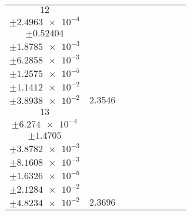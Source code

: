 \documentclass[8pt]{article}
\begin{document}
\begin{longtable}[l]{c c c c c c c c c}
$\num{12}$ & \begin{tabular}[c]{@{}c@{}}$\num{2.8388e-2}$ \\ $\pm\num{2.4963e-4}$\end{tabular} & \begin{tabular}[c]{@{}c@{}}$\num{-1.2234}$ \\ $\pm\num{0.52404}$\end{tabular} & \begin{tabular}[c]{@{}c@{}}$\num{-7.0287}$ \\ $\pm\num{1.8785e-3}$\end{tabular} & \begin{tabular}[c]{@{}c@{}}$\num{3.6197e+3}$ \\ $\pm\num{6.2858e-3}$\end{tabular} & \begin{tabular}[c]{@{}c@{}}$\num{7.2414}$ \\ $\pm\num{1.2575e-5}$\end{tabular} & \begin{tabular}[c]{@{}c@{}}$\num{1.1361}$ \\ $\pm\num{1.1412e-2}$\end{tabular} & \begin{tabular}[c]{@{}c@{}}$\num{4.2167}$ \\ $\pm\num{3.8938e-2}$\end{tabular} & $\num{2.3546}$\\
$\num{13}$ & \begin{tabular}[c]{@{}c@{}}$\num{2.7945e-2}$ \\ $\pm\num{6.274e-4}$\end{tabular} & \begin{tabular}[c]{@{}c@{}}$\num{0.53606}$ \\ $\pm\num{1.4705}$\end{tabular} & \begin{tabular}[c]{@{}c@{}}$\num{-0.85622}$ \\ $\pm\num{3.8782e-3}$\end{tabular} & \begin{tabular}[c]{@{}c@{}}$\num{3.6258e+3}$ \\ $\pm\num{8.1608e-3}$\end{tabular} & \begin{tabular}[c]{@{}c@{}}$\num{7.2537}$ \\ $\pm\num{1.6326e-5}$\end{tabular} & \begin{tabular}[c]{@{}c@{}}$\num{1.1601}$ \\ $\pm\num{2.1284e-2}$\end{tabular} & \begin{tabular}[c]{@{}c@{}}$\num{4.1257}$ \\ $\pm\num{4.8234e-2}$\end{tabular} & $\num{2.3696}$\\

\end{longtable}
\end{document}
